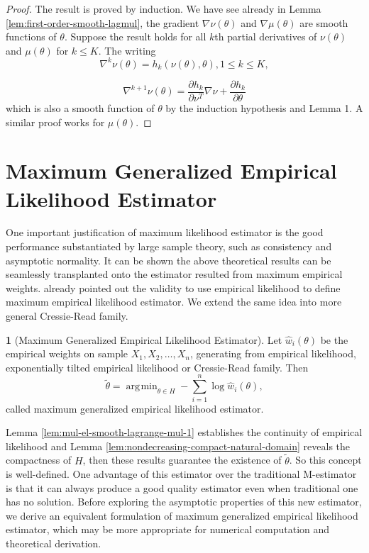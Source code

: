 \documentclass[oneside,english]{amsbook}
\numberwithin{section}{chapter}
\numberwithin{equation}{section}
\numberwithin{figure}{section}
\theoremstyle{plain}
\theoremstyle{plain}
\theoremstyle{definition}
\newtheorem{defn}{\protect\definitionname}
\theoremstyle{plain}
\theoremstyle{plain}
\theoremstyle{remark}
\theoremstyle{definition}
\theoremstyle{definition}
\DeclareMathOperator*{\argmin}{\arg\!\min}
\providecommand{\definitionname}{Definition}
\begin{document}
\begin{proof}
The result is proved by induction. We have see already in Lemma \ref{lem:first-order-smooth-lagmul},
the gradient $\nabla\nu\left(\theta\right)$ and $\nabla\mu\left(\theta\right)$
are smooth functions of $\theta$. Suppose the result holds for all
$k$th partial derivatives of $\nu\left(\theta\right)$ and $\mu\left(\theta\right)$
for $k\le K$. The writing 
\[
\nabla^{k}\nu\left(\theta\right)=h_{k}\left(\nu\left(\theta\right),\theta\right),1\le k\le K,
\]
 
\[
\nabla^{k+1}\nu\left(\theta\right)=\frac{\partial h_{k}}{\partial\nu^{T}}\nabla\nu+\frac{\partial h_{k}}{\partial\theta}
\]
which is also a smooth function of $\theta$ by the induction hypothesis
and Lemma 1. A similar proof works for $\mu\left(\theta\right)$.
\end{proof}

\section{Maximum Generalized Empirical Likelihood Estimator}

One important justification of maximum likelihood estimator is the
good performance substantiated by large sample theory, such as consistency
and asymptotic normality. It can be shown the above theoretical results
can be seamlessly transplanted onto the estimator resulted from maximum
empirical weights. \citet{qin1994empirical} already pointed out the
validity to use empirical likelihood to define maximum empirical likelihood
estimator. We extend the same idea into more general Cressie-Read
family. 
\begin{defn}[Maximum Generalized Empirical Likelihood Estimator]
\label{def:gmele}Let $\hat{w}_{i}\left(\theta\right)$ be the empirical
weights on sample $X_{1},X_{2},\ldots,X_{n}$, generating from empirical
likelihood, exponentially tilted empirical likelihood or Cressie-Read
family. Then 
\[
\tilde{\theta}=\argmin_{\theta\in H}-\sum_{i=1}^{n}\log\hat{w}_{i}\left(\theta\right),
\]
called  maximum generalized empirical likelihood estimator.
\end{defn}
Lemma \ref{lem:mul-el-smooth-lagrange-mul-1} establishes the continuity
of empirical likelihood and Lemma \ref{lem:nondecreasing-compact-natural-domain}
reveals the compactness of $H$, then these results guarantee the
existence of $\tilde{\theta}$. So this concept is well-defined. One
advantage of this estimator over the traditional M-estimator is that
it can always produce a good quality estimator even when traditional
one has no solution. Before exploring the asymptotic properties of
this new estimator, we derive an equivalent formulation of  maximum
generalized empirical likelihood estimator, which may be more appropriate
for numerical computation and theoretical derivation. 
\end{document}
